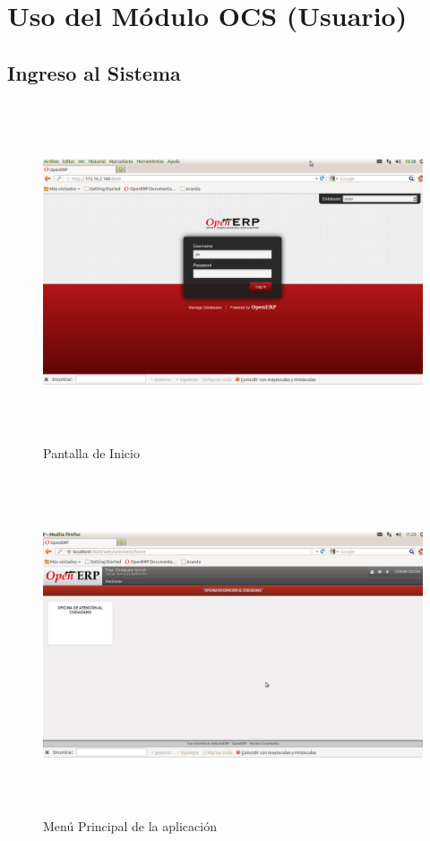 %
%
\section{Uso del Módulo OCS (Usuario)}

\subsection{Ingreso al Sistema}
\begin{figure}[h]
 \centering
 \includegraphics[width=17cm,height=10cm]{./Imagenes/Login.png}
 \caption{Pantalla de Inicio}
 \label{fig:login}
\end{figure}


\begin{figure}[h]
 \centering
 \includegraphics[width=17cm,height=10cm]{./Imagenes/menumain.png}
 \caption{Menú Principal de la aplicación}
 \label{fig:menumain}
\end{figure}

